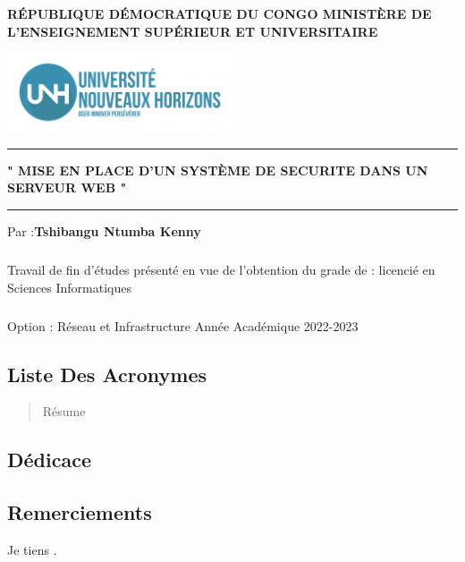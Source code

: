 

	\author{Tshibangu Ntumba Kenny}
	
	\begin{titlepage}
		
		 \centering
		
		\textbf{\Large RÉPUBLIQUE DÉMOCRATIQUE DU CONGO
			MINISTÈRE DE L’ENSEIGNEMENT SUPÉRIEUR ET UNIVERSITAIRE}
		\vspace{1.5cm}
		 
		 \includegraphics[width=0.5\textwidth]{PhotoMemoire/Logo.jpg}
		 \vspace{3.5cm}
		 
		 \hrule
		 \vspace{0.6cm}
		 \textbf{\Large "  MISE EN PLACE D'UN SYSTÈME DE SECURITE DANS UN SERVEUR WEB "}
		 \vspace{0.6cm}
		 \hrule
		 \vspace{2.5cm}
		 
		  \large Par :\textbf{Tshibangu Ntumba Kenny} 
		  
		  \paragraph{ } Travail de fin d’études présenté en vue de l’obtention
		  du grade de : licencié en Sciences Informatiques
		\paragraph{ } \Large{ Option : Réseau et Infrastructure}
		 \vfill
		 {\LARGE Année Académique 2022-2023}
		 \centering
	\end{titlepage}
\begin{center}
\tableofcontents
\pagebreak
\end{center}
\begin{center}
	\listoffigures
	\pagebreak 
	\begin{center}
		\chapter*{Liste Des Acronymes}
	\end{center}
\end{center}
 
	    \begin{abstract}
	    	 Résume
	    \end{abstract}
	    \begin{center}
	    	\chapter*{Dédicace}
	    \end{center}
    \begin{center}
    	\chapter*{Remerciements}
    	Je tiens .
    \end{center}
    
